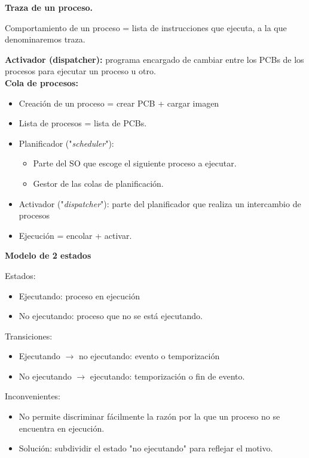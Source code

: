 \documentclass{article}
\begin{document}
\textbf{Traza de un proceso.}

Comportamiento de un proceso = lista de instrucciones que ejecuta, a la que denominaremos traza. 

\textbf{Activador (dispatcher):} programa encargado de cambiar entre los PCBs de los procesos para ejecutar un proceso u otro.\\

\textbf{Cola de procesos:}
\begin{itemize}
\item Creación de un proceso = crear PCB + cargar imagen

\item Lista de procesos = lista de PCBs.

\item Planificador ("\textit{scheduler}"):
	\begin{itemize}
	\item Parte del SO que escoge el siguiente proceso a ejecutar.
	
	\item Gestor de las colas de planificación.
	\end{itemize}

\item Activador ("\textit{dispatcher}"): parte del planificador que realiza un intercambio de procesos

\item Ejecución = encolar + activar.
\end{itemize}

\textbf{Modelo de 2 estados}

Estados:
\begin{itemize}
\item Ejecutando: proceso en ejecución

\item No ejecutando: proceso que no se está ejecutando.
\end{itemize}

Transiciones:
\begin{itemize}
\item Ejecutando $\rightarrow$ no ejecutando: evento o temporización

\item No ejecutando $\rightarrow$ ejecutando: temporización o fin de evento.
\end{itemize}

Inconvenientes:
\begin{itemize}
\item No permite discriminar fácilmente la razón por la que un proceso no se encuentra en ejecución.

\item Solución: subdividir el estado "no ejecutando" para reflejar el motivo.
\end{itemize}
\end{document}
